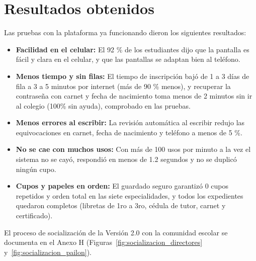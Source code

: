 \section{Resultados obtenidos}
\label{sec:resultados_obtenidos}

Las pruebas con la plataforma ya funcionando dieron los siguientes resultados:

\begin{itemize}
    \item \textbf{Facilidad en el celular:} El 92 \% de los estudiantes dijo que la pantalla es fácil y clara en el celular, y que las pantallas se adaptan bien al teléfono.
    \item \textbf{Menos tiempo y sin filas:} El tiempo de inscripción bajó de 1 a 3 días de fila a 3 a 5 minutos por internet (más de 90 \% menos), y recuperar la contraseña con carnet y fecha de nacimiento toma menos de 2 minutos sin ir al colegio (100\% sin ayuda), comprobado en las pruebas.
    \item \textbf{Menos errores al escribir:} La revisión automática al escribir redujo las equivocaciones en carnet, fecha de nacimiento y teléfono a menos de 5 \%.
    \item \textbf{No se cae con muchos usos:} Con más de 100 usos por minuto a la vez el sistema no se cayó, respondió en menos de 1.2 segundos y no se duplicó ningún cupo.
    \item \textbf{Cupos y papeles en orden:} El guardado seguro garantizó 0 cupos repetidos y orden total en las siete especialidades, y todos los expedientes quedaron completos (libretas de 1ro a 3ro, cédula de tutor, carnet y certificado).
\end{itemize}

El proceso de socialización de la Versión 2.0 con la comunidad escolar se documenta en el Anexo H (Figuras~\ref{fig:socializacion_directores} y~\ref{fig:socializacion_pailon}).
